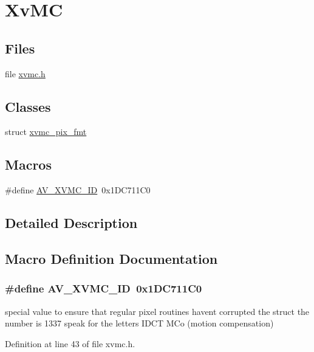 \hypertarget{group__lavc__codec__hwaccel__xvmc}{}\section{Xv\+MC}
\label{group__lavc__codec__hwaccel__xvmc}
\subsection*{Files}
\begin{DoxyCompactItemize}
\item 
file \hyperlink{xvmc_8h}{xvmc.\+h}
\end{DoxyCompactItemize}
\subsection*{Classes}
\begin{DoxyCompactItemize}
\item 
struct \hyperlink{structxvmc__pix__fmt}{xvmc\+\_\+pix\+\_\+fmt}
\end{DoxyCompactItemize}
\subsection*{Macros}
\begin{DoxyCompactItemize}
\item 
\#define \hyperlink{group__lavc__codec__hwaccel__xvmc_ga0355b33d2190dfdd27d3c0c0ee6fc888}{A\+V\+\_\+\+X\+V\+M\+C\+\_\+\+ID}~0x1\+D\+C711\+C0
\end{DoxyCompactItemize}


\subsection{Detailed Description}


\subsection{Macro Definition Documentation}
\subsubsection[{\texorpdfstring{A\+V\+\_\+\+X\+V\+M\+C\+\_\+\+ID}{AV_XVMC_ID}}]{\setlength{\rightskip}{0pt plus 5cm}\#define A\+V\+\_\+\+X\+V\+M\+C\+\_\+\+ID~0x1\+D\+C711\+C0}\hypertarget{group__lavc__codec__hwaccel__xvmc_ga0355b33d2190dfdd27d3c0c0ee6fc888}{}\label{group__lavc__codec__hwaccel__xvmc_ga0355b33d2190dfdd27d3c0c0ee6fc888}
special value to ensure that regular pixel routines haven\textquotesingle{}t corrupted the struct the number is 1337 speak for the letters I\+D\+CT M\+Co (motion compensation) 

Definition at line 43 of file xvmc.\+h.

